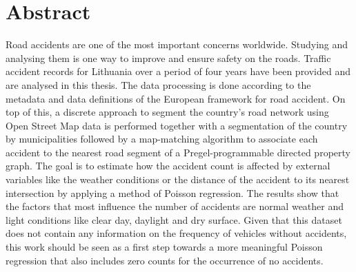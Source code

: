 \chapter*{Abstract}
\begin{comment}
Sell your idea!
Make the reader want to stay with you!
Single paragraph, 100-200 words

Four parts/sentences
1. What's the problem
2. How did you solve it
3. What are the results
4. Conclusion (what it means for the future)
Make sure the abstract stands on its own!
-No reference tags
- Avoid acronyms

\end{comment}

Road accidents are one of the most important concerns worldwide. 
Studying and analysing them is one way to improve and ensure safety on the roads. 
Traffic accident records for Lithuania over a period of four years have been provided and are analysed in this thesis. 
The data processing is done according to the metadata and data definitions of the European framework for road accident. 
On top of this, a discrete approach to segment the country's road network using Open Street Map data is performed together with a segmentation of the country by municipalities followed by a map-matching algorithm to associate each accident to the nearest road segment of a Pregel-programmable directed property graph. 
The goal is to estimate how the accident count is affected by external variables like the weather conditions or the distance of the accident to its nearest intersection by applying a method of Poisson regression. 
The results show that the factors that most influence the number of accidents are normal weather and light conditions like clear day, daylight and dry surface. 
Given that this dataset does not contain any information on the frequency of vehicles without accidents, this work should be seen as a first step towards a more meaningful Poisson regression that also includes zero counts for the occurrence of no accidents.
